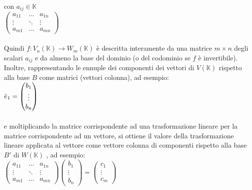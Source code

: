 \documentclass[a4paper, twoside, italian, 11pt]{book}
\newcommand{\overbar}[1] {\mkern 1.5mu\overline{\mkern-1.5mu#1\mkern-1.5mu}\mkern 1.5mu}
\newcommand{\K}{\mathbb K}
\begin{document}
\noindent
con $a_{ij} \in \K$ \\

\noindent
$\begin{pmatrix}
a_{11} & \dots & a_{1n} \\
\vdots & \ddots & \vdots \\
a_{m1} & \dots & a_{mn}
\end{pmatrix}$ \\\\

\noindent
Quindi $f : V_n(\K) \rightarrow W_m(\K)$ è descritta interamente da una matrice $m \times n$ degli scalari $a_{ij}$ e da almeno la base del dominio (o del codominio se $f$ è invertibile).\\

\noindent
Inoltre, rappresentando le ennuple dei componenti dei vettori di $V(\K)$ rispetto alla base $B$ come matrici (vettori colonna), ad esempio: \\

$\overbar e_1 =
\begin{pmatrix}
b_1 \\
\vdots \\
b_n
\end{pmatrix}$ \\\\

\noindent
e moltiplicando la matrice corrispondente ad una trasformazione lineare per la matrice corrispondente ad un vettore, si ottiene il valore della trasformazione lineare applicata al vettore come vettore colonna di componenti rispetto alla base $B'$ di $W(\K)$ , ad esempio: \\

$\begin{pmatrix}
a_{11} & \dots & a_{1n} \\
\vdots & \ddots & \vdots \\
a_{m1} & \dots & a_{mn}
\end{pmatrix}
\begin{pmatrix}
b_1 \\
\vdots \\
b_n
\end{pmatrix} = 
\begin{pmatrix}
c_1 \\
\vdots \\
c_m
\end{pmatrix}
$ \\\\\\
\end{document}

